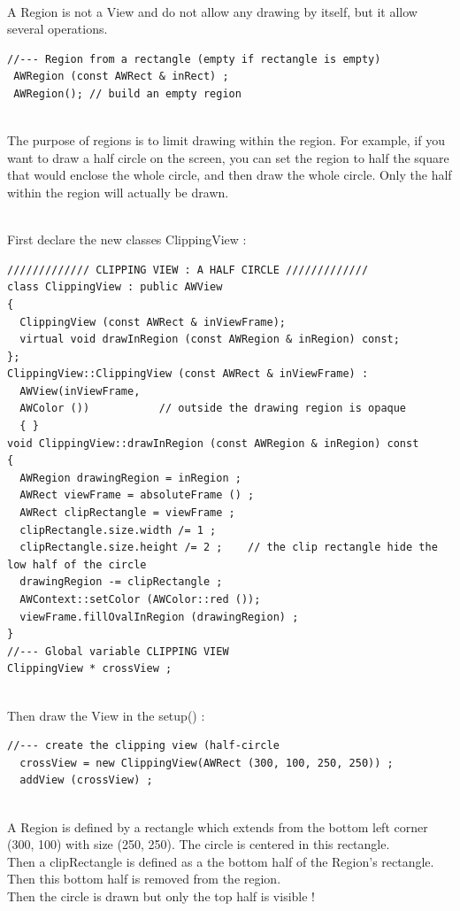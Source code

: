 \documentclass[a4paper,11pt]{extarticle}
\begin{document}
~\\ A Region is not a View and do not allow any drawing by itself, but it allow several operations.

\begin{lstlisting}[language=Arduinonl]
//--- Region from a rectangle (empty if rectangle is empty)
 AWRegion (const AWRect & inRect) ; 
 AWRegion(); // build an empty region
\end{lstlisting}
  
~\\ The purpose of regions is to limit drawing within the region. For example, if you want to draw a half circle on the screen, you can set the region to half the square that would enclose the whole circle, and then draw the whole circle. Only the half within the region will actually be drawn.

~\\ First declare the new classes  ClippingView :

\begin{lstlisting}[language=Arduinonl]
///////////// CLIPPING VIEW : A HALF CIRCLE /////////////
class ClippingView : public AWView
{
  ClippingView (const AWRect & inViewFrame);
  virtual void drawInRegion (const AWRegion & inRegion) const;
};
ClippingView::ClippingView (const AWRect & inViewFrame) :
  AWView(inViewFrame, 
  AWColor ())           // outside the drawing region is opaque 
  { }
void ClippingView::drawInRegion (const AWRegion & inRegion) const
{
  AWRegion drawingRegion = inRegion ;
  AWRect viewFrame = absoluteFrame () ;
  AWRect clipRectangle = viewFrame ;
  clipRectangle.size.width /= 1 ;
  clipRectangle.size.height /= 2 ;    // the clip rectangle hide the low half of the circle
  drawingRegion -= clipRectangle ;
  AWContext::setColor (AWColor::red ());
  viewFrame.fillOvalInRegion (drawingRegion) ;
}
//--- Global variable CLIPPING VIEW
ClippingView * crossView ;
\end{lstlisting}

~\\ Then draw the View in the setup() :
\begin{lstlisting}[language=Arduinonl]
//--- create the clipping view (half-circle
  crossView = new ClippingView(AWRect (300, 100, 250, 250)) ;
  addView (crossView) ;
\end{lstlisting}

~\\ A Region is defined by a rectangle which extends from the bottom left corner (300, 100) with size (250, 250). The circle is centered in this rectangle.
~\\ Then a clipRectangle is defined as a the bottom half of the Region's rectangle.
~\\ Then this bottom half is removed from the region.
~\\ Then the circle is drawn but only the top half is visible !
\end{document}
